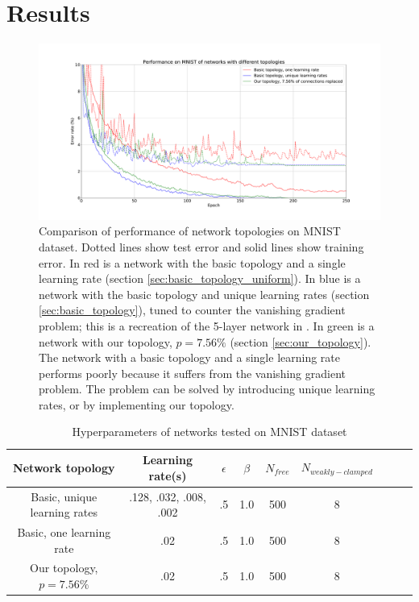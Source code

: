 \documentclass[format=sigconf]{acmart}
\begin{document}
\section{Results}

\begin{figure}
  \centering
  \includegraphics[width=\columnwidth]{figures/MNIST_network_comparison.pdf}
  \caption{Comparison of performance of network topologies on MNIST dataset. Dotted lines show test error and solid lines show training error. In red is a network with the basic topology and a single learning rate (section \ref{sec:basic_topology_uniform}). In blue is a network with the basic topology and unique learning rates (section \ref{sec:basic_topology}), tuned to counter the vanishing gradient problem; this is a recreation of the 5-layer network in \cite{scellier17}. In green is a network with our topology, $p=7.56\%$ (section \ref{sec:our_topology}). The network with a basic topology and a single learning rate performs poorly because it suffers from the vanishing gradient problem. The problem can be solved by introducing unique learning rates, or by implementing our topology.}
  \label{fig:mnist_comparison}
\end{figure}

\begin{table}
\begin{center}
\begin{tabular}{|c|c|c|c|c|c|c|c|c|}
\hline
Network topology & Learning rate(s) & $\epsilon$ & $\beta$ & $N_{free}$ & $N_{weakly-clamped}$\\\hline\hline
Basic, unique learning rates & .128, .032, .008, .002 & .5 & 1.0 & 500 & 8 \\\hline
Basic, one learning rate & .02 & .5 & 1.0 & 500 & 8  \\\hline
Our topology, $p=7.56\%$ & .02 & .5 & 1.0 & 500 & 8 \\\hline
\end{tabular}
\end{center}
\caption{Hyperparameters of networks tested on MNIST dataset}
\label{table:hyperparameters}
\end{table}
\end{document}
